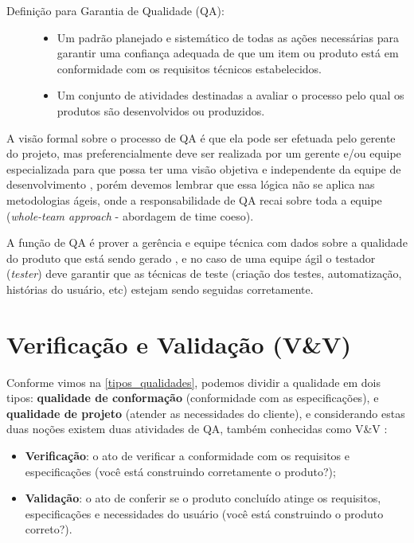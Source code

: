 \documentclass[
	12pt,				%
	openright,			%
	oneside,			%
	a4paper,			%
	english,			%
	brazil,				%
	]{abntex2}
\begin{document}
\begin{description}
    \item[Definição  para Garantia de Qualidade (QA):] \hfill
        \begin{itemize}
            \item Um padrão planejado e sistemático de todas as ações necessárias para garantir uma confiança adequada de que um item ou produto está em conformidade com os requisitos técnicos estabelecidos.
            \item Um conjunto de atividades destinadas a avaliar o processo pelo qual os produtos são desenvolvidos ou produzidos.
        \end{itemize}
\end{description}

A visão formal sobre o processo de QA é que ela pode ser efetuada pelo gerente do projeto, mas preferencialmente deve ser realizada por um gerente e/ou equipe especializada para que possa ter uma visão objetiva e independente da equipe de desenvolvimento \cite{SOMMERVILLE2011,WAZLAWICK2013}, porém devemos lembrar que essa lógica não se aplica nas metodologias ágeis, onde a responsabilidade de QA recai sobre toda a equipe (\emph{whole-team approach} - abordagem de time coeso).

A função de QA é prover a gerência e equipe técnica com dados sobre a qualidade do produto que está sendo gerado \cite{SOMMERVILLE2011}, e no caso de uma equipe ágil o testador (\emph{tester}) deve garantir que as técnicas de teste (criação dos testes, automatização, histórias do usuário, etc) estejam sendo seguidas corretamente.

\section{Verificação e Validação (V\&V)}
Conforme vimos na \autoref{tipos_qualidades}, podemos dividir a qualidade em dois tipos: \textbf{qualidade de conformação} (conformidade com as especificações), e \textbf{qualidade de projeto} (atender as necessidades do cliente), e considerando estas duas noções existem duas atividades de QA, também conhecidas como V\&V \cite{tsui2013, PRESSMAN2010}:
\begin{itemize}
    \item \textbf{Verificação}: o ato de verificar a conformidade com os requisitos e especificações (você está construindo corretamente o produto?);
    \item \textbf{Validação}: o ato de conferir se o produto concluído atinge os requisitos, especificações e necessidades do usuário (você está construindo o produto correto?).
\end{itemize}
\end{document}

